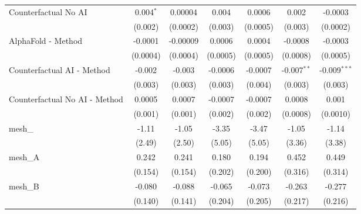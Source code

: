 \begin{tabular}{lcccccc}
   Counterfactual No AI                                        & 0.004$^{*}$   & 0.00004      & 0.004         & 0.0006        & 0.002         & -0.0003\\   
                                                               & (0.002)       & (0.0002)     & (0.003)       & (0.0005)      & (0.003)       & (0.0002)\\   
   AlphaFold - Method                                          & -0.0001       & -0.00009     & 0.0006        & 0.0004        & -0.0008       & -0.0003\\   
                                                               & (0.0004)      & (0.0004)     & (0.0005)      & (0.0005)      & (0.0008)      & (0.0005)\\   
   Counterfactual AI - Method                                  & -0.002        & -0.003       & -0.0006       & -0.0007       & -0.007$^{**}$ & -0.009$^{***}$\\   
                                                               & (0.003)       & (0.003)      & (0.003)       & (0.004)       & (0.003)       & (0.003)\\   
   Counterfactual No AI - Method                               & 0.0005        & 0.0007       & -0.0007       & -0.0007       & 0.0008        & 0.001\\   
                                                               & (0.001)       & (0.001)      & (0.002)       & (0.002)       & (0.0008)      & (0.0010)\\   
   mesh\_                                                      & -1.11         & -1.05        & -3.35         & -3.47         & -1.05         & -1.14\\   
                                                               & (2.49)        & (2.50)       & (5.05)        & (5.05)        & (3.36)        & (3.38)\\   
   mesh\_A                                                     & 0.242         & 0.241        & 0.180         & 0.194         & 0.452         & 0.449\\   
                                                               & (0.154)       & (0.154)      & (0.202)       & (0.200)       & (0.316)       & (0.314)\\   
   mesh\_B                                                     & -0.080        & -0.088       & -0.065        & -0.073        & -0.263        & -0.277\\   
                                                               & (0.140)       & (0.141)      & (0.204)       & (0.205)       & (0.217)       & (0.216)\\   

\end{tabular}
